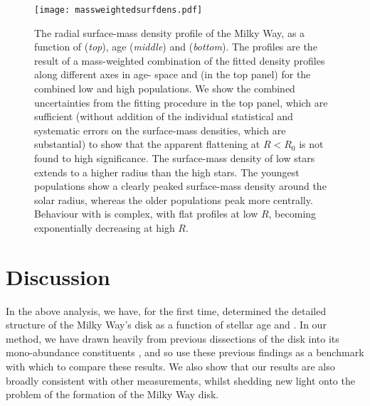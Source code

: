 \begin{figure}
	\texttt{[image: massweightedsurfdens.pdf]}
	\centering
    \caption{The radial surface-mass density profile of the Milky Way, as a function of \afe{} (\emph{top}), age (\emph{middle}) and \feh{} (\emph{bottom}). The profiles are the result of a mass-weighted combination of the fitted density profiles along different axes in age-\feh{} space and (in the top panel) for the combined low and high \afe{} populations. We show the combined uncertainties from the fitting procedure in the top panel, which are sufficient (without addition of the individual statistical and systematic errors on the surface-mass densities, which are substantial) to show that the apparent flattening at $R < R_0$ is not found to high significance. The surface-mass density of low \afe{} stars extends to a higher radius than the high \afe{} stars. The youngest populations show a clearly peaked surface-mass density around the solar radius, whereas the older populations peak more centrally. Behaviour with \feh{} is complex, with flat profiles at low $R$, becoming exponentially decreasing at high $R$.}
    \label{fig:profcombo}
\end{figure}

\section{Discussion}
\label{sec:discussiona}
In the above analysis, we have, for the first time, determined the detailed structure of the Milky Way's disk as a function of stellar age and \feh{}. In our method, we have drawn heavily from previous dissections of the disk into its mono-abundance constituents \citep[MAPs;][]{2012ApJ...753..148B,2016ApJ...823...30B}, and so use these previous findings as a benchmark with which to compare these results. We also show that our results are also broadly consistent with other measurements, whilst shedding new light onto the problem of the formation of the Milky Way disk.


